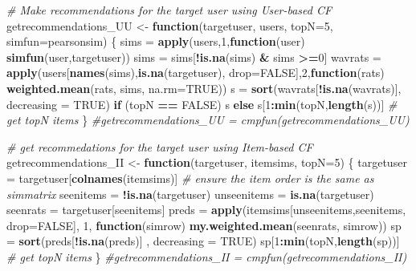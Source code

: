 \documentclass[]{article}
\newenvironment{Shaded}{\begin{snugshade}}{\end{snugshade}}
\newcommand{\CommentTok}[1]{\textcolor[rgb]{0.56,0.35,0.01}{\textit{#1}}}
\newcommand{\ControlFlowTok}[1]{\textcolor[rgb]{0.13,0.29,0.53}{\textbf{#1}}}
\newcommand{\DataTypeTok}[1]{\textcolor[rgb]{0.13,0.29,0.53}{#1}}
\newcommand{\DecValTok}[1]{\textcolor[rgb]{0.00,0.00,0.81}{#1}}
\newcommand{\KeywordTok}[1]{\textcolor[rgb]{0.13,0.29,0.53}{\textbf{#1}}}
\newcommand{\NormalTok}[1]{#1}
\newcommand{\OperatorTok}[1]{\textcolor[rgb]{0.81,0.36,0.00}{\textbf{#1}}}
\newcommand{\OtherTok}[1]{\textcolor[rgb]{0.56,0.35,0.01}{#1}}
\newcommand{\StringTok}[1]{\textcolor[rgb]{0.31,0.60,0.02}{#1}}
\begin{document}
\begin{Shaded}
\begin{Highlighting}[]
\CommentTok{# Make recommendations for the target user using User-based CF}
\NormalTok{getrecommendations_UU <-}\StringTok{ }\ControlFlowTok{function}\NormalTok{(targetuser, users, }\DataTypeTok{topN=}\DecValTok{5}\NormalTok{, }\DataTypeTok{simfun=}\NormalTok{pearsonsim) \{}
\NormalTok{  sims =}\StringTok{ }\KeywordTok{apply}\NormalTok{(users,}\DecValTok{1}\NormalTok{,}\ControlFlowTok{function}\NormalTok{(user) }\KeywordTok{simfun}\NormalTok{(user,targetuser)) }
\NormalTok{  sims =}\StringTok{ }\NormalTok{sims[}\OperatorTok{!}\KeywordTok{is.na}\NormalTok{(sims) }\OperatorTok{&}\StringTok{ }\NormalTok{sims }\OperatorTok{>=}\DecValTok{0}\NormalTok{]}
\NormalTok{  wavrats =}\StringTok{ }\KeywordTok{apply}\NormalTok{(users[}\KeywordTok{names}\NormalTok{(sims),}\KeywordTok{is.na}\NormalTok{(targetuser), }\DataTypeTok{drop=}\OtherTok{FALSE}\NormalTok{],}\DecValTok{2}\NormalTok{,}\ControlFlowTok{function}\NormalTok{(rats) }\KeywordTok{weighted.mean}\NormalTok{(rats, sims, }\DataTypeTok{na.rm=}\OtherTok{TRUE}\NormalTok{))}
\NormalTok{  s =}\StringTok{ }\KeywordTok{sort}\NormalTok{(wavrats[}\OperatorTok{!}\KeywordTok{is.na}\NormalTok{(wavrats)], }\DataTypeTok{decreasing =} \OtherTok{TRUE}\NormalTok{)}
  \ControlFlowTok{if}\NormalTok{ (topN }\OperatorTok{==}\StringTok{ }\OtherTok{FALSE}\NormalTok{) s }\ControlFlowTok{else}\NormalTok{ s[}\DecValTok{1}\OperatorTok{:}\KeywordTok{min}\NormalTok{(topN,}\KeywordTok{length}\NormalTok{(s))] }\CommentTok{# get topN items}
\NormalTok{\}}
\CommentTok{#getrecommendations_UU = cmpfun(getrecommendations_UU)}

\CommentTok{# get recommedations for the target user using Item-based CF}
\NormalTok{getrecommendations_II <-}\StringTok{ }\ControlFlowTok{function}\NormalTok{(targetuser, itemsims, }\DataTypeTok{topN=}\DecValTok{5}\NormalTok{) \{}
\NormalTok{  targetuser =}\StringTok{ }\NormalTok{targetuser[}\KeywordTok{colnames}\NormalTok{(itemsims)] }\CommentTok{# ensure the item order is the same as simmatrix}
\NormalTok{  seenitems  =}\StringTok{ }\OperatorTok{!}\KeywordTok{is.na}\NormalTok{(targetuser)}
\NormalTok{  unseenitems =}\StringTok{ }\KeywordTok{is.na}\NormalTok{(targetuser)}
\NormalTok{  seenrats =}\StringTok{ }\NormalTok{targetuser[seenitems]}
\NormalTok{  preds =}\StringTok{ }\KeywordTok{apply}\NormalTok{(itemsims[unseenitems,seenitems, }\DataTypeTok{drop=}\OtherTok{FALSE}\NormalTok{], }\DecValTok{1}\NormalTok{, }\ControlFlowTok{function}\NormalTok{(simrow) }\KeywordTok{my.weighted.mean}\NormalTok{(seenrats, simrow))}
\NormalTok{  sp =}\StringTok{ }\KeywordTok{sort}\NormalTok{(preds[}\OperatorTok{!}\KeywordTok{is.na}\NormalTok{(preds)] , }\DataTypeTok{decreasing =} \OtherTok{TRUE}\NormalTok{)}
\NormalTok{  sp[}\DecValTok{1}\OperatorTok{:}\KeywordTok{min}\NormalTok{(topN,}\KeywordTok{length}\NormalTok{(sp))]  }\CommentTok{# get topN items}
\NormalTok{\}}
\CommentTok{#getrecommendations_II = cmpfun(getrecommendations_II)}


\end{Highlighting}
\end{Shaded}
\end{document}
